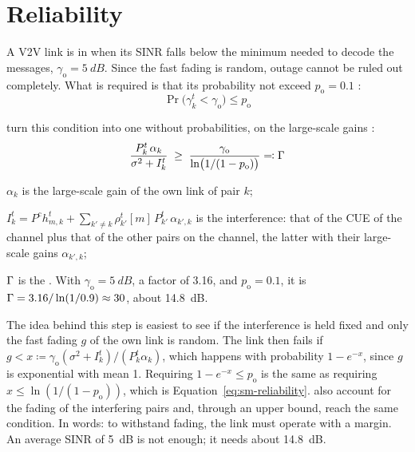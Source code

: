 \section{Reliability}
\label{sec:sm-reliability}

A \ac{V2V} link is in  when its \ac{SINR} falls below the minimum needed to decode the
messages, $\gamma_{\mathrm{o}} = \SI{5}{dB}$. Since the fast fading is random, outage cannot be ruled out
completely. What is required is that its probability not exceed $p_{\mathrm{o}} = 0.1$
\cite[Eq.~9]{li+22fedmarl}:
\begin{equation}
  \Pr\bigl(\gamma_k^t < \gamma_{\mathrm{o}}\bigr) \le p_{\mathrm{o}}
  \label{eq:sm-outage}
\end{equation}

\citet{li+22fedmarl} turn this condition into one without probabilities, on the large-scale gains
\cite[Eq.~15]{li+22fedmarl}:
\begin{equation}
  \frac{P_k^t\, \alpha_k}{\sigma^2 + I_k^t} \;\ge\;
  \frac{\gamma_{\mathrm{o}}}{\ln\bigl(1/(1 - p_{\mathrm{o}})\bigr)} \eqqcolon \Gamma
  \label{eq:sm-reliability}
\end{equation}
\begin{wherelist}
  \item $\alpha_k$ is the large-scale gain of the own link of pair $k$;
  \item $\textstyle I_k^t = P^{\mathrm{c}} h_{m,k}^t + \sum_{k' \ne k} \rho_{k'}^t[m]\, P_{k'}^t\, \alpha_{k',k}$ is
    the interference: that of the \ac{CUE} of the channel plus that of the other pairs on the channel, the
    latter with their large-scale gains $\alpha_{k',k}$;
  \item $\Gamma$ is the . With $\gamma_{\mathrm{o}} = \SI{5}{dB}$, a factor of
    3.16, and $p_{\mathrm{o}} = 0.1$, it is $\Gamma = 3.16 / \ln(1/0.9) \approx 30$, about \SI{14.8}{dB}.
\end{wherelist}
The idea behind this step is easiest to see if the interference is held fixed and only the fast fading $g$
of the own link is random. The link then fails if
$g < x \coloneqq \gamma_{\mathrm{o}} (\sigma^2 + I_k^t) / (P_k^t \alpha_k)$, which happens with
probability $1 - e^{-x}$, since $g$ is exponential with mean 1. Requiring $1 - e^{-x} \le p_{\mathrm{o}}$
is the same as requiring $x \le \ln(1/(1-p_{\mathrm{o}}))$, which is Equation~\ref{eq:sm-reliability}.
\citet{li+22fedmarl} also account for the fading of the interfering pairs and, through an upper bound, reach
the same condition. In words:
to withstand fading, the link must operate with a margin. An average \ac{SINR} of \SI{5}{dB} is not
enough; it needs about \SI{14.8}{dB}.

